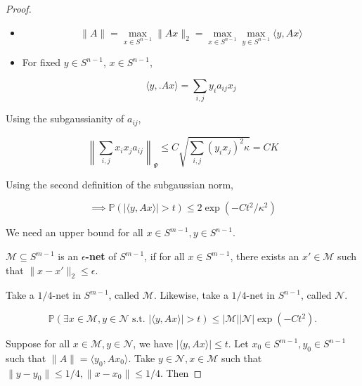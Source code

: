 \begin{proof}

\begin{itemize}

\item

\[
\lVert A \rVert = \max_{x \in S^{n-1}} \lVert A x \rVert_2 = \max_{x \in S^{n-1}} \max_{y \in S^{n-1}} \langle y, Ax \rangle
\]

\item For fixed \(y \in S^{n-1}\), \(x \in S^{n-1}\),

\[
\langle y,. Ax \rangle = \sum_{i,j} y_i a_{ij} x_j
\]

\end{itemize}

Using the subgaussianity of \(a_{ij}\),

\[
\left\lVert \sum_{i,j} x_i x_j a_{ij} \right\rVert_\Psi \leq C \sqrt{\sum_{i,j} (y_i x_j)^2 \kappa} = CK
\]

Using the second definition of the subgaussian norm,

\[
\implies \mathbb{P} \left( | \langle y, Ax \rangle| > t \right) \leq 2 \exp(-C t^2/\kappa^2) 
\]

We need an upper bound for all \(x \in S^{m-1}, y \in S^{n-1}\). 

\begin{definition}

\(\mathcal{M} \subseteq S^{m-1}\) is an \textbf{\(\epsilon\)-net} of \(S^{m-1}\), if for all \(x \in S^{m-1}\), there exists an \(x' \in \mathcal{M}\) such that \(\lVert x - x' \rVert_2 \leq \epsilon\).

\end{definition}

Take a \(1/4\)-net in \(S^{m-1}\), called \(\mathcal{M}\). Likewise, take a \(1/4\)-net in \(S^{n-1}\), called \(\mathcal{N}\). 

\[
\mathbb{P} \left( \exists x \in \mathcal{M}, y \in \mathcal{N} \text{ s.t. } | \langle y, Ax \rangle | > t \right) \leq | \mathcal{M}| | \mathcal{N}| \exp(-Ct^2).
\]



Suppose for all \(x \in \mathcal{M}, y \in \mathcal{N}\), we have \(| \langle y, Ax \rangle| \leq t\). Let \(x_0 \in S^{m-1}, y_0 \in S^{n-1}\) such that \(\lVert A \rVert = \langle y_0, Ax_0 \rangle\). Take \(y \in \mathcal{N}, x \in \mathcal{M}\) such that \(\lVert y - y_0 \rVert \leq 1/4, \lVert x - x_0 \rVert \leq 1/4\). Then


\end{proof}
